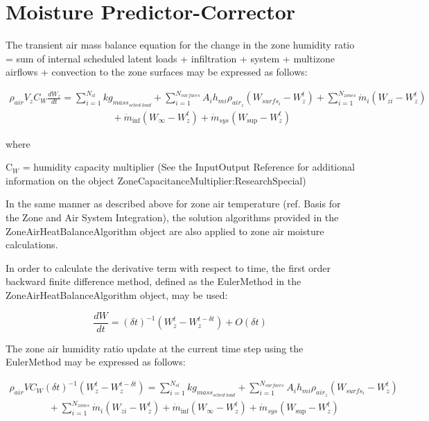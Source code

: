 \section{Moisture Predictor-Corrector}\label{moisture-predictor-corrector}

The transient air mass balance equation for the change in the zone humidity ratio = sum of internal scheduled latent loads + infiltration + system + multizone airflows + convection to the zone surfaces may be expressed as follows:

\begin{equation}
\begin{array}{l}
{\rho_{air}}{V_z}{C_W}\frac{{d{W_z}}}{{dt}} = \sum\limits_{i = 1}^{{N_{sl}}} {k{g_{mas{s_{sched\;load}}}}}  + \sum\limits_{i = 1}^{{N_{surfaces}}} {{A_i}{h_{mi}}} {\rho_{ai{r_z}}}\left( {{W_{surf{s_i}}} - W_z^t} \right) + \sum\limits_{i = 1}^{{N_{zones}}} {{{\dot m}_i}} \left( {{W_{zi}} - W_z^t} \right)\\\;\;\;\;\;\;\;\;\;\;\;\;\;\;\;\;\;\;\;\;\;\;\;\;\;\;\;\;\;\;\;\;\;\;\;\;\;\; + {{\dot m}_{\inf }}\left( {{W_\infty } - W_z^t} \right) + {{\dot m}_{sys}}\left( {{W_{\sup }} - W_z^t} \right)
\end{array}
\end{equation}

where

C\(_{W}\) = humidity capacity multiplier (See the InputOutput Reference for additional information on the object ZoneCapacitanceMultiplier:ResearchSpecial)

In the same manner as described above for zone air temperature (ref. Basis for the Zone and Air System Integration), the solution algorithms provided in the ZoneAirHeatBalanceAlgorithm object are also applied to zone air moisture calculations.

In order to calculate the derivative term with respect to time, the first order backward finite difference method, defined as the EulerMethod in the ZoneAirHeatBalanceAlgorithm object, may be used:

\begin{equation}
\frac{{dW}}{{dt}} = {\left( {\delta t} \right)^{ - 1}}(W_z^t - W_z^{t - \delta t}) + O(\delta t)
\end{equation}

The zone air humidity ratio update at the current time step using the EulerMethod may be expressed as follows:

\begin{equation}
\begin{array}{l}{\rho_{air}}V{C_W}{\left( {\delta t} \right)^{ - 1}}\left( {W_z^t - W_z^{t - \delta t}} \right) = \sum\limits_{i = 1}^{{N_{sl}}} {k{g_{mas{s_{sched\;load}}}}}  + \sum\limits_{i = 1}^{{N_{surfaces}}} {{A_i}{h_{mi}}} {\rho_{ai{r_z}}}\left( {{W_{surf{s_i}}} - W_z^t} \right) \\
\quad \quad \quad \quad + \sum\limits_{i = 1}^{{N_{zones}}} {{{\dot m}_i}} \left( {{W_{zi}} - W_z^t} \right) + {{\dot m}_{\inf }}\left( {{W_\infty } - W_z^t} \right) + {{\dot m}_{sys}}\left( {{W_{\sup }} - W_z^t} \right)\end{array}
\end{equation}

